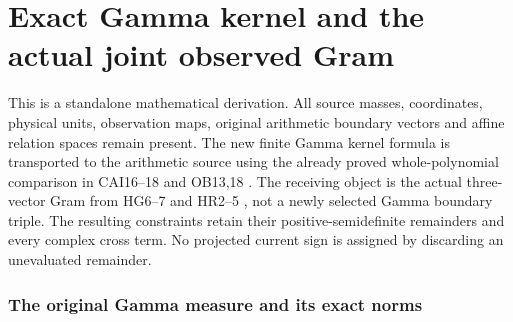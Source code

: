 

\clearpage\begingroup
\part*{Exact Gamma kernel and the actual joint observed Gram}
\newtheorem{lgammatheorem}{Theorem}
\newtheorem{lgammalemma}[lgammatheorem]{Lemma}
\newtheorem{lgammaproposition}[lgammatheorem]{Proposition}
\newcommand{\lgammaC}{\mathbb C}
\newcommand{\lgammaR}{\mathbb R}
\newcommand{\lgammanorm}[1]{\left\lVert#1\right\rVert}
\newcommand{\lgammaim}{\operatorname{im}}
\newcommand{\lgammaremm}{\operatorname{rem}}



This is a standalone mathematical derivation.  All source masses,
coordinates, physical units, observation maps, original arithmetic boundary
vectors and affine relation spaces remain present.  The new finite Gamma
kernel formula is transported to the arithmetic source using the already
proved whole-polynomial comparison in CAI16--18 and OB13,18
\cite{lgamma:CAI,lgamma:OB}.  The receiving object is the actual three-vector Gram from
HG6--7 and HR2--5 \cite{lgamma:HG,lgamma:HR}, not a newly selected Gamma boundary triple.
The resulting constraints retain their positive-semidefinite remainders
and every complex cross term.  No projected current sign is assigned by
discarding an unevaluated remainder.

\section{The original Gamma measure and its exact norms}

